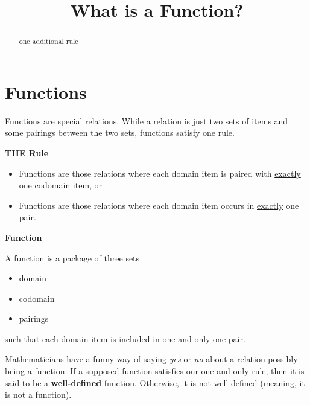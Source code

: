 \documentclass{ximera}
\title{What is a Function?}
\begin{document}
\begin{abstract}
one additional rule
\end{abstract}
\maketitle




\section{Functions}

Functions are special relations. While a relation is just two sets of items and some pairings between the two sets, functions satisfy one rule. 


\begin{condition} \textbf{\textcolor{purple!85!blue}{THE Rule}} 

\begin{itemize}
\item Functions are those relations where each domain item is paired with \underline{exactly} one codomain item, or
\item Functions are those relations where each domain item occurs in \underline{exactly} one pair.
\end{itemize}
\end{condition}






\begin{definition} \textbf{\textcolor{green!50!black}{Function}}

A function is a package of three sets
\begin{itemize}
\item domain
\item codomain
\item pairings
\end{itemize}

such that each domain item is included in \underline{one and only one} pair.

\end{definition}




Mathematicians have a funny way of saying \textit{yes} or \textit{no} about a relation possibly being a function. If a supposed function satisfies our one and only rule, then it is said to be a \textbf{well-defined} function.  Otherwise, it is not well-defined (meaning, it is not a function).
\end{document}
